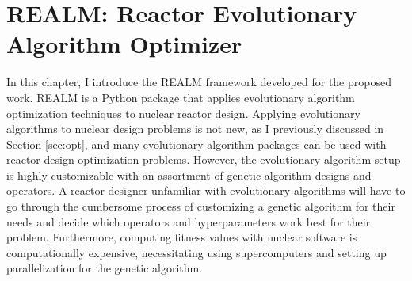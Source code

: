 \chapter{REALM: Reactor Evolutionary Algorithm Optimizer}

In this chapter, I introduce the \gls{REALM} framework developed for the
proposed work.
\gls{REALM} is a Python package that applies evolutionary algorithm 
optimization techniques to nuclear reactor design. 
Applying evolutionary algorithms to nuclear design problems is not new, as I
previously discussed in Section \ref{sec:opt}, and many evolutionary algorithm 
packages can be used with reactor design optimization problems. 
However, the evolutionary algorithm setup is highly customizable with
an assortment of genetic algorithm designs and operators.
A reactor designer unfamiliar with evolutionary algorithms will have
to go through the cumbersome process of customizing a genetic algorithm 
for their needs and decide which operators and hyperparameters work best for 
their problem. 
Furthermore, computing fitness values with nuclear software is computationally 
expensive, necessitating using supercomputers and setting up parallelization 
for the genetic algorithm.

